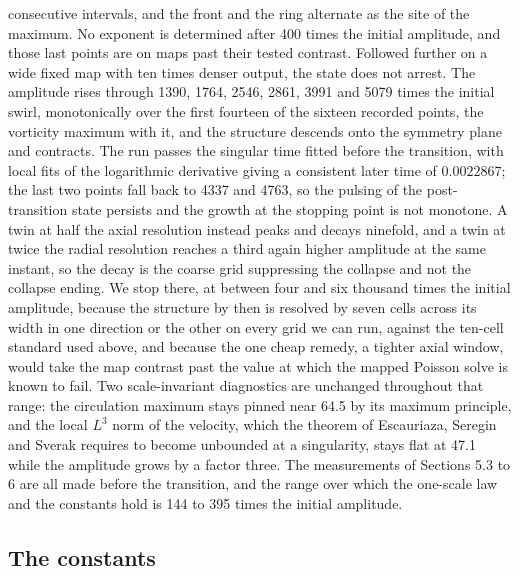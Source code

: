 \documentclass[11pt]{article}
\begin{document}
consecutive intervals, and the front and the ring alternate as the site of the maximum. No exponent is determined after 400 times the initial amplitude, and those last points are on maps past their tested contrast. Followed further on a wide fixed map with ten times denser output, the state does not arrest. The amplitude rises through 1390, 1764, 2546, 2861, 3991 and 5079 times the initial swirl, monotonically over the first fourteen of the sixteen recorded points, the vorticity maximum with it, and the structure descends onto the symmetry plane and contracts. The run passes the singular time fitted before the transition, with local fits of the logarithmic derivative giving a consistent later time of $0.0022867$; the last two points fall back to 4337 and 4763, so the pulsing of the post-transition state persists and the growth at the stopping point is not monotone. A twin at half the axial resolution instead peaks and decays ninefold, and a twin at twice the radial resolution reaches a third again higher amplitude at the same instant, so the decay is the coarse grid suppressing the collapse and not the collapse ending. We stop there, at between four and six thousand times the initial amplitude, because the structure by then is resolved by seven cells across its width in one direction or the other on every grid we can run, against the ten-cell standard used above, and because the one cheap remedy, a tighter axial window, would take the map contrast past the value at which the mapped Poisson solve is known to fail. Two scale-invariant diagnostics are unchanged throughout that range: the circulation maximum stays pinned near 64.5 by its maximum principle, and the local $L^3$ norm of the velocity, which the theorem of Escauriaza, Seregin and Sverak \cite{ESS03} requires to become unbounded at a singularity, stays flat at 47.1 while the amplitude grows by a factor three. The measurements of Sections 5.3 to 6 are all made before the transition, and the range over which the one-scale law and the constants hold is 144 to 395 times the initial amplitude.

\subsection{The constants}
\end{document}
